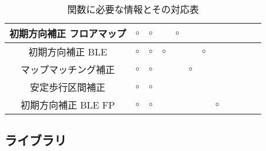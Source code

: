 \documentclass[Japanese]{abstruct}
\begin{document}
\begin{table*}[b]
{\begin{tabular}{|c|c|c|c|c|c|c|c|c|c|c|c|}
			初期方向補正 フロアマップ & \multicolumn{1}{c|}{$\circ$} & \multicolumn{1}{c|}{$\circ$} &                              & \multicolumn{1}{c|}{$\circ$} &                                                                                                               &                              &                              &                              &    &                              &    \\ \hline
			初期方向補正 BLE    & \multicolumn{1}{c|}{$\circ$} & \multicolumn{1}{c|}{$\circ$} & \multicolumn{1}{c|}{$\circ$} &                              &                                                                                                               & \multicolumn{1}{c|}{$\circ$} &                              &                              &    &                              &    \\ \hline
			マップマッチング補正    & \multicolumn{1}{c|}{$\circ$} & \multicolumn{1}{c|}{$\circ$} &                              &                              & \multicolumn{1}{c|}{$\circ$}                                                                                  &                              &                              &                              &    &                              &    \\ \hline
			安定歩行区間補正      & \multicolumn{1}{c|}{$\circ$} & \multicolumn{1}{c|}{$\circ$} &                              &                              &                                                                                                               &                              &                              &                              &    &                              &    \\ \hline
			初期方向補正 BLE FP & \multicolumn{1}{c|}{$\circ$} & \multicolumn{1}{c|}{$\circ$} &                              &                              &                                                                                                               &                              & \multicolumn{1}{c|}{$\circ$} &                              &    &                              &    \\ \hline
		\end{tabular}
	}
	\caption{関数に必要な情報とその対応表} \label{}
\end{table*}


\subsection{ライブラリ}
\end{document}
